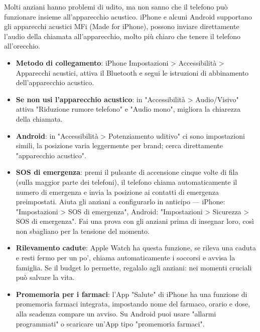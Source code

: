 
Molti anziani hanno problemi di udito, ma non sanno che il telefono può funzionare insieme all'apparecchio acustico. iPhone e alcuni Android supportano gli apparecchi acustici MFi (Made for iPhone), possono inviare direttamente l'audio della chiamata all'apparecchio, molto più chiaro che tenere il telefono all'orecchio.

\begin{itemize}
  \item \textbf{Metodo di collegamento}: iPhone Impostazioni > Accessibilità > Apparecchi acustici, attiva il Bluetooth e segui le istruzioni di abbinamento dell'apparecchio acustico.
  \item \textbf{Se non usi l'apparecchio acustico}: in "Accessibilità > Audio/Visivo" attiva "Riduzione rumore telefono" e "Audio mono", migliora la chiarezza della chiamata.
  \item \textbf{Android}: in "Accessibilità > Potenziamento uditivo" ci sono impostazioni simili, la posizione varia leggermente per brand; cerca direttamente "apparecchio acustico".
\end{itemize}


\begin{itemize}
  \item \textbf{SOS di emergenza}: premi il pulsante di accensione cinque volte di fila (sulla maggior parte dei telefoni), il telefono chiama automaticamente il numero di emergenza e invia la posizione ai contatti di emergenza preimpostati. Aiuta gli anziani a configurarlo in anticipo — iPhone: "Impostazioni > SOS di emergenza", Android: "Impostazioni > Sicurezza > SOS di emergenza". Fai una prova con gli anziani prima di insegnar loro, così non sbagliano per la tensione del momento.
  \item \textbf{Rilevamento cadute}: Apple Watch ha questa funzione, se rileva una caduta e resti fermo per un po', chiama automaticamente i soccorsi e avvisa la famiglia. Se il budget lo permette, regalalo agli anziani: nei momenti cruciali può salvare la vita.
  \item \textbf{Promemoria per i farmaci}: l'App "Salute" di iPhone ha una funzione di promemoria farmaci integrata, impostando nome del farmaco, orario e dose, alla scadenza compare un avviso. Su Android puoi usare "allarmi programmati" o scaricare un'App tipo "promemoria farmaci".
\end{itemize}

